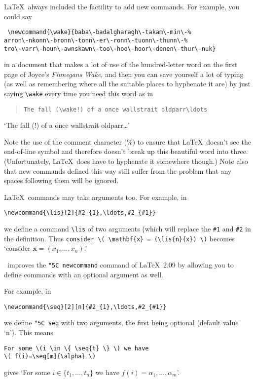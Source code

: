 \documentclass[11pt,a4paper]{article}
\newcommand{\cn}[1]{{\tt \char"5C #1}}
\begin{document}
\begin{sloppypar}
\LaTeX\ always included the factility to add new commands.
For example, you could say
\begin{verbatim} \newcommand{\wake}{baba\-badalgharagh\-takam\-min\-%
arron\-nkonn\-bronn\-tonn\-er\-ronn\-tuonn\-thunn\-%
tro\-varr\-houn\-awnskawn\-too\-hoo\-hoor\-denen\-thur\-nuk}
\end{verbatim}
in a document that makes a lot of use of the hundred-letter word 
on the first page of Joyce's \textit{Finnegans Wake}, and then you
can save yourself a lot of typing (as well as remembering where
all the suitable places to hyphenate it are) by just saying \verb|\wake|
every time you need this word as in
\begin{quote}
\verb|The fall (\wake!) of a once wallstrait oldparr\ldots|
\end{quote}
`The fall (\wake!) of a once wallstrait oldparr\ldots'
\end{sloppypar}

Note the use of the comment character (\%) to ensure that \LaTeX\
doesn't see the end-of-line symbol and therefore doesn't break up this
beautiful word into three.  (Unfortunately, \LaTeX\ does have to hyphenate 
it somewhere though.)  Note also that new commands defined this way
still suffer from the problem that any spaces following them will 
be ignored.

\newcommand{\lis}[2]{#2_{1},\ldots,#2_{#1}}
\LaTeX\ commands may take arguments too. For example, in
\begin{verbatim}
\newcommand{\lis}[2]{#2_{1},\ldots,#2_{#1}}
\end{verbatim}
we define a command \verb|\lis| of two arguments (which will replace
the \verb|#1| and \verb|#2| in the definition.  Thus
\verb|consider \( \mathbf{x} = (\lis{n}{x}) \)| becomes
`consider \( \mathbf{x} = (\lis{n}{x}) \).'

\LaTeXe\ improves the \cn{newcommand} command of \LaTeX~2.09 
by allowing you to define commands with an optional argument as well.

\newcommand{\seq}[2][n]{#2_{1},\ldots,#2_{#1}}
For example, in
\begin{verbatim}
\newcommand{\seq}[2][n]{#2_{1},\ldots,#2_{#1}}
\end{verbatim}
we define \cn{seq} with two arguments, the first being optional
(default value `n').  This means
\begin{verbatim}
For some \(i \in \{ \seq{t} \} \) we have 
\( f(i)=\seq[m]{\alpha} \)
\end{verbatim}
gives
`For some \(i \in \{ \seq{t} \} \) we have \( f(i)=\seq[m]{\alpha} \)'.
\end{document}
